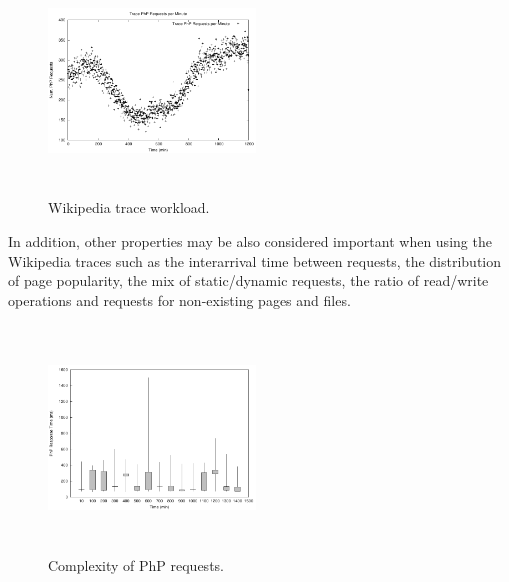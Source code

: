 


\begin{figure}
\begin{center}
\includegraphics[width=0.49\textwidth, height=6cm]{./images/traceWorkload}
\end{center}
\caption{Wikipedia trace workload.}
\label{workload}
\end{figure}

In addition, other properties may be also considered important when using the Wikipedia traces such as the interarrival time between requests, the distribution of page popularity, the mix of static/dynamic requests, the ratio of read/write operations and requests for non-existing pages and files.




\begin{figure}
\begin{center}
\includegraphics[width=0.49\textwidth, height=6cm]{./images/phpRespTimeDispersion}
\end{center}
\caption{Complexity of PhP requests.}
\label{phpRespTimeDispersion}
\end{figure}

